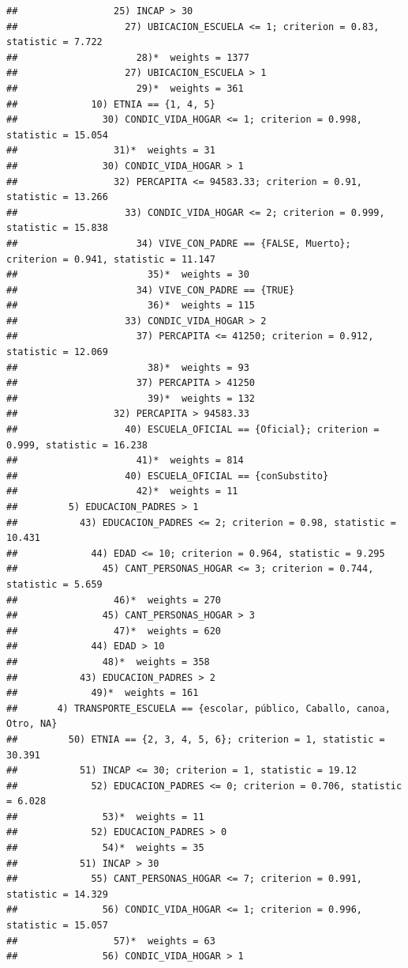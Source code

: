 \documentclass[
]{article}
\begin{document}
\begin{verbatim}
##                 25) INCAP > 30
##                   27) UBICACION_ESCUELA <= 1; criterion = 0.83, statistic = 7.722
##                     28)*  weights = 1377 
##                   27) UBICACION_ESCUELA > 1
##                     29)*  weights = 361 
##             10) ETNIA == {1, 4, 5}
##               30) CONDIC_VIDA_HOGAR <= 1; criterion = 0.998, statistic = 15.054
##                 31)*  weights = 31 
##               30) CONDIC_VIDA_HOGAR > 1
##                 32) PERCAPITA <= 94583.33; criterion = 0.91, statistic = 13.266
##                   33) CONDIC_VIDA_HOGAR <= 2; criterion = 0.999, statistic = 15.838
##                     34) VIVE_CON_PADRE == {FALSE, Muerto}; criterion = 0.941, statistic = 11.147
##                       35)*  weights = 30 
##                     34) VIVE_CON_PADRE == {TRUE}
##                       36)*  weights = 115 
##                   33) CONDIC_VIDA_HOGAR > 2
##                     37) PERCAPITA <= 41250; criterion = 0.912, statistic = 12.069
##                       38)*  weights = 93 
##                     37) PERCAPITA > 41250
##                       39)*  weights = 132 
##                 32) PERCAPITA > 94583.33
##                   40) ESCUELA_OFICIAL == {Oficial}; criterion = 0.999, statistic = 16.238
##                     41)*  weights = 814 
##                   40) ESCUELA_OFICIAL == {conSubstito}
##                     42)*  weights = 11 
##         5) EDUCACION_PADRES > 1
##           43) EDUCACION_PADRES <= 2; criterion = 0.98, statistic = 10.431
##             44) EDAD <= 10; criterion = 0.964, statistic = 9.295
##               45) CANT_PERSONAS_HOGAR <= 3; criterion = 0.744, statistic = 5.659
##                 46)*  weights = 270 
##               45) CANT_PERSONAS_HOGAR > 3
##                 47)*  weights = 620 
##             44) EDAD > 10
##               48)*  weights = 358 
##           43) EDUCACION_PADRES > 2
##             49)*  weights = 161 
##       4) TRANSPORTE_ESCUELA == {escolar, público, Caballo, canoa, Otro, NA}
##         50) ETNIA == {2, 3, 4, 5, 6}; criterion = 1, statistic = 30.391
##           51) INCAP <= 30; criterion = 1, statistic = 19.12
##             52) EDUCACION_PADRES <= 0; criterion = 0.706, statistic = 6.028
##               53)*  weights = 11 
##             52) EDUCACION_PADRES > 0
##               54)*  weights = 35 
##           51) INCAP > 30
##             55) CANT_PERSONAS_HOGAR <= 7; criterion = 0.991, statistic = 14.329
##               56) CONDIC_VIDA_HOGAR <= 1; criterion = 0.996, statistic = 15.057
##                 57)*  weights = 63 
##               56) CONDIC_VIDA_HOGAR > 1

\end{verbatim}
\end{document}
